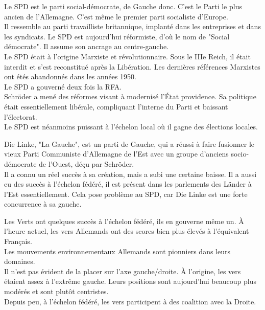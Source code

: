 \documentclass[10pt, a4paper, openany]{book}
\begin{document}
Le SPD est le parti social-démocrate, de Gauche donc. C'est le Parti le plus ancien de l'Allemagne. C'est même le premier parti socialiste d'Europe. \\
Il ressemble au parti travailliste britannique, implanté dans les entreprises et dans les syndicats. Le SPD est aujourd'hui réformiste, d'où le nom de "Social démocrate". Il assume son ancrage au centre-gauche. \\
Le SPD était à l'origine Marxiste et révolutionnaire. Sous le IIIe Reich, il était interdit et s'est reconstitué après la Libération. Les dernières références Marxistes ont étés abandonnés dans les années 1950. \\
Le SPD a gouverné deux fois la RFA. \\
Schröder a mené des réformes visant à modernisé l'État providence. Sa politique était essentiellement libérale, compliquant l'interne du Parti et baissant l'électorat. \\
Le SPD est néanmoins puissant à l'échelon local où il gagne des élections locales. 


Die Linke, "La Gauche", est un parti de Gauche, qui a réussi à faire fusionner le vieux Parti Communiste d'Allemagne de l'Est avec un groupe d'anciens socio-démocrate de l'Ouest, déçu par Schröder. \\
Il a connu un réel succès à sa création, mais a subi une certaine baisse. Il a aussi eu des succès à l'échelon fédéré, il est présent dans les parlements des Länder à l'Est essentiellement. Cela pose problème au SPD, car Die Linke est une forte concurrence à sa gauche. 


Les Verts ont quelques succès à l'échelon fédéré, ils en gouverne même un. À l'heure actuel, les vers Allemands ont des scores bien plus élevés à l'équivalent Français. \\
Les mouvements environnementaux Allemands sont pionniers dans leurs domaines. \\
Il n'est pas évident de la placer sur l'axe gauche/droite. À l'origine, les vers étaient assez à l'extrême gauche. Leurs positions sont aujourd'hui beaucoup plus modérés et sont plutôt centristes. \\
Depuis peu, à l'échelon fédéré, les vers participent à des coalition avec la Droite. 
\end{document}
